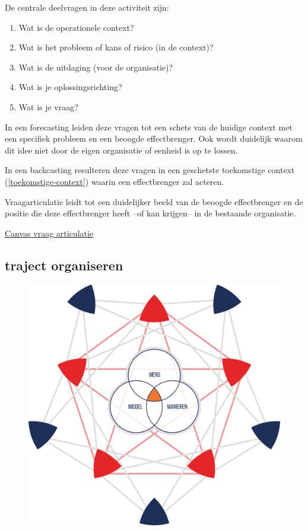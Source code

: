 \documentclass[
]{book}
\providecommand{\tightlist}{%
  \setlength{\itemsep}{0pt}\setlength{\parskip}{0pt}}
\begin{document}
De centrale deelvragen in deze activiteit zijn:

\begin{enumerate}
\def\labelenumi{\arabic{enumi}.}
\tightlist
\item
  Wat is de operationele context?
\item
  Wat is het probleem of kans of risico (in de context)?
\item
  Wat is de uitdaging (voor de organisatie)?
\item
  Wat is je oplossingsrichting?
\item
  Wat is je vraag?
\end{enumerate}

In een forecasting leiden deze vragen tot een schets van de huidige context met een specifiek probleem en een beoogde effectbrenger. Ook wordt duidelijk waarom dit idee niet door de eigen organisatie of eenheid is op te lossen.

In een backcasting resulteren deze vragen in een geschetste toekomstige context (\ref{toekomstige-context}) waarin een effectbrenger zal acteren.

Vraagarticulatie leidt tot een duidelijker beeld van de beoogde effectbrenger en de positie die deze effectbrenger heeft --of kan krijgen-- in de bestaande organisatie.

\href{data/images/20200116-CDE-canvassen-vraagarticulatie.svg}{Canvas vraag articulatie}

\hypertarget{traject-organiseren}{%
\subsection{traject organiseren}\label{traject-organiseren}}

\begin{figure}
\includegraphics[width=350pt]{data/images/20210401-MDI-trajectorganiseren} \caption{ }\label{fig:unnamed-chunk-20}
\end{figure}
\end{document}
